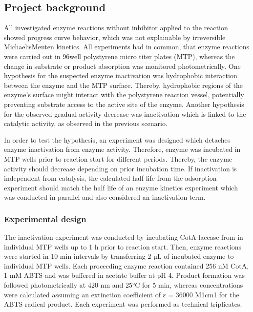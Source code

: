 \documentclass[letterpaper,12pt,english]{jupyterBook}
\begin{document}
\subsection{Project background}
\label{\detokenize{scenarios/enzyme_inactivation:project-background}}
\sphinxAtStartPar
All investigated enzyme reactions without inhibitor applied to the reaction showed progress curve behavior, which was not explainable by irreversible Michaelis\sphinxhyphen{}Menten kinetics. All experiments had in common, that enzyme reactions were carried out in 96\sphinxhyphen{}well polystyrene micro titer plates (MTP), whereas the change in substrate or product absorption was monitored photometrically. One hypothesis for the suspected enzyme inactivation was hydrophobic interaction between the enzyme and the MTP surface. Thereby, hydrophobic regions of the enzyme’s surface might interact with the polystyrene reaction vessel, potentially preventing substrate access to the active site of the enzyme. Another hypothesis for the observed gradual activity decrease was inactivation which is linked to the catalytic activity, as observed in the previous scenario.

\sphinxAtStartPar
In order to test the hypothesis, an experiment was designed which detaches enzyme inactivation from enzyme activity. Therefore, enzyme was incubated in MTP wells prior to reaction start for different periods. Thereby, the enzyme activity should decrease depending on prior incubation time. If inactivation is independent from catalysis, the calculated half life from the adsorption experiment should match the half life of an enzyme kinetics experiment which was conducted in parallel and also considered an inactivation term.


\subsubsection{Experimental design}
\label{\detokenize{scenarios/enzyme_inactivation:experimental-design}}
\sphinxAtStartPar
{}

The inactivation experiment was conducted by incubating CotA laccase from  in individual MTP wells up to 1 h prior to reaction start. Then, enzyme reactions were started in 10 min intervals by transferring 2 µL of incubated enzyme to individual MTP wells. Each proceeding enzyme reaction contained 256 nM CotA, 1 mM ABTS and was buffered in acetate buffer at pH 4. Product formation was followed photometrically at 420 nm and 25°C for 5 min, whereas concentrations were calculated assuming an extinction coefficient of ε = 36000 M\sphinxhyphen{}1cm\sphinxhyphen{}1 for the ABTS radical product. Each experiment was performed as technical triplicates.
\end{document}
